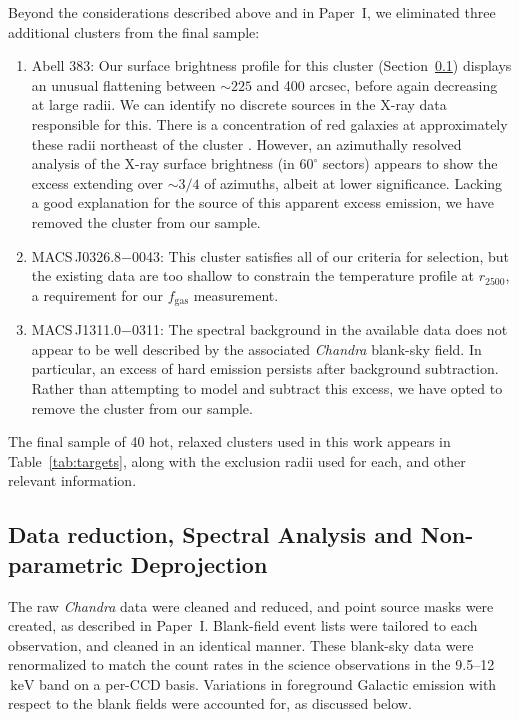 \documentclass[useAMS,usenatbib,usegraphicx]{mn2e}
\newcommand*{\mysub}[2]{\ensuremath{#1_{\mathrm{#2}}}}
\newcommand*{\unit}[1]{\ensuremath{\mathrm{\, #1}}}
\newcommand*{\fgas}{\mysub{f}{gas}}
\newcommand*{\keV}{\unit{keV}}
\newcommand*{\secref}{Section}
\newcommand*{\tabref}{Table}
\newcommand*{\Chandra}{{\it Chandra}}
\newcommand*{\morphpaper}{Paper~I}
\begin{document}
Beyond the considerations described above and in \morphpaper{}, we eliminated three additional clusters from the final sample:
\begin{enumerate}
\item Abell 383: Our surface brightness profile for this cluster (\secref~\ref{sec:projct}) displays an unusual flattening between $\sim225$ and 400 arcsec, before again decreasing at large radii. We can identify no discrete sources in the X-ray data responsible for this. There is a concentration of red galaxies at approximately these radii northeast of the cluster \citep{Zitrin1108.4929}. However, an azimuthally resolved analysis of the X-ray surface brightness (in $60^\circ$ sectors) appears to show the excess extending over $\sim3/4$ of azimuths, albeit at lower significance. Lacking a good explanation for the source of this apparent excess emission, we have removed the cluster from our sample.
\item MACS\,J0326.8$-$0043: This cluster satisfies all of our criteria for selection, but the existing data are too shallow to constrain the temperature profile at $r_{2500}$, a requirement for our \fgas{} measurement.
\item MACS\,J1311.0$-$0311: The spectral background in the available data does not appear to be well described by the associated \Chandra{} blank-sky field. In particular, an excess of hard emission persists after background subtraction. Rather than attempting to model and subtract this excess, we have opted to remove the cluster from our sample.
\end{enumerate}

The final sample of 40 hot, relaxed clusters used in this work appears in \tabref~\ref{tab:targets}, along with the exclusion radii used for each, and other relevant information.



\subsection{Data reduction, Spectral Analysis and Non-parametric Deprojection} \label{sec:projct}

The raw \Chandra{} data were cleaned and reduced, and point source masks were created, as described in \morphpaper{}. Blank-field event lists were tailored to each observation, and cleaned in an identical manner. These blank-sky data were renormalized to match the count rates in the science observations in the 9.5--12\keV{} band on a per-CCD basis. Variations in foreground Galactic emission with respect to the blank fields were accounted for, as discussed below.
\end{document}
